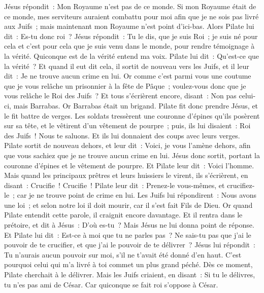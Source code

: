 \begin{multicols}{2}
Jésus répondit~: Mon Royaume n'est pas de ce monde. Si mon Royaume était de ce monde, mes serviteurs auraient combattu pour moi afin que je ne sois pas livré aux Juifs~; mais maintenant mon Royaume n'est point d'ici-bas.
Alors Pilate lui dit~: Es-tu donc roi~? Jésus répondit~: Tu le dis, que je suis Roi~; je suis né pour cela et c'est pour cela que je suis venu dans le monde, pour rendre témoignage à la vérité. Quiconque est de la vérité entend ma voix.
Pilate lui dit~: Qu'est-ce que la vérité~? Et quand il eut dit cela, il sortit de nouveau vers les Juifs, et il leur dit~: Je ne trouve aucun crime en lui.
Or comme c'est parmi vous une coutume que je vous relâche un prisonnier à la fête de Pâque~; voulez-vous donc que je vous relâche le Roi des Juifs~?
Et tous s'écrièrent encore, disant~: Non pas celui-ci, mais Barrabas. Or Barrabas était un brigand.
\VerseOne{}Pilate fit donc prendre Jésus, et le fit battre de verges.
Les soldats tressèrent une couronne d'épines qu'ils posèrent sur sa tête, et le vêtirent d'un vêtement de pourpre~;
puis, ils lui disaient~: Roi des Juifs~! Nous te saluons. Et ils lui donnaient des coups avec leurs verges.
Pilate sortit de nouveau dehors, et leur dit~: Voici, je vous l'amène dehors, afin que vous sachiez que je ne trouve aucun crime en lui.
Jésus donc sortit, portant la couronne d'épines et le vêtement de pourpre. Et Pilate leur dit~: Voici l'homme.
Mais quand les principaux prêtres et leurs huissiers le virent, ils s'écrièrent, en disant~: Crucifie~! Crucifie~! Pilate leur dit~: Prenez-le vous-mêmes, et crucifiez-le~; car je ne trouve point de crime en lui.
Les Juifs lui répondirent~: Nous avons une loi~; et selon notre loi il doit mourir, car il s'est fait Fils de Dieu.
Or quand Pilate entendit cette parole, il craignit encore davantage.
Et il rentra dans le prétoire, et dit à Jésus~: D'où es-tu~? Mais Jésus ne lui donna point de réponse.
Et Pilate lui dit~: Est-ce à moi que tu ne parles pas~? Ne sais-tu pas que j'ai le pouvoir de te crucifier, et que j'ai le pouvoir de te délivrer~?
Jésus lui répondit~: Tu n'aurais aucun pouvoir sur moi, s'il ne t'avait été donné d'en haut. C'est pourquoi celui qui m'a livré à toi commet un plus grand péché.
Dès ce moment, Pilate cherchait à le délivrer. Mais les Juifs criaient, en disant~: Si tu le délivres, tu n'es pas ami de César. Car quiconque se fait roi s'oppose à César.

\end{multicols}
